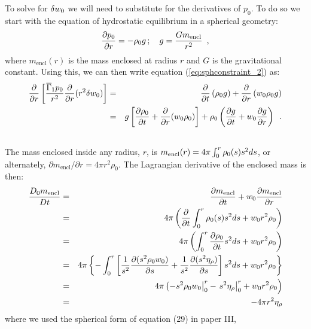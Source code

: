 \begin{enumerate}
\begin{description}
To solve for $\delta w_0$ we will need to substitute for the derivatives of $p_0.$
To do so we start with the equation of hydrostatic equilibrium in a spherical geometry:
\begin{equation}
\frac{\partial p_0}{\partial r} = -\rho_0 g \, ; \quad
g = \frac{G m_\mathrm{encl}}{r^2}\enskip,
\end{equation}
where $m_\mathrm{encl}(r)$ is the mass enclosed at radius $r$ and $G$ is the
gravitational constant.  
Using this, we can then write equation (\ref{eq:sphconstraint_2}) as:
\begin{eqnarray}
\frac{\partial}{\partial r} \left[ \frac{\overline{\Gamma}_1 p_0}{r^2} \frac{\partial}{\partial r} (r^2 \delta w_0) \right] &=&
 \frac{\partial}{\partial t} \left (\rho_0 g \right )
+\frac{\partial}{\partial r} \left (w_0 \rho_0 g \right) \nonumber \\
&=&
  g \left[ \frac{\partial \rho_0}{\partial t} + \frac{\partial}{\partial r} (w_0 \rho_0) \right]
+ \rho_0 \left( \frac{\partial g}{\partial t} + w_0 \frac{\partial g}{\partial r} \right) \enskip.\nonumber\\
&&
\label{eq:sphconstraint_3}
\end{eqnarray}
The mass enclosed inside any radius, $r$, is $m_\mathrm{encl}(r) = 4 \pi
\int_0^r \rho_0(s) s^2 ds$, or alternately, $\partial m_\mathrm{encl}/\partial r = 4\pi r^2 \rho_0$.  
The Lagrangian derivative of the enclosed mass is then:
\begin{eqnarray}
\frac{D_0 m_\mathrm{encl}}{D t} &=& \frac{\partial m_\mathrm{encl}}{\partial t} + w_0 \frac{\partial m_\mathrm{encl}}{\partial r} \nonumber \\
 &=& 4\pi \left( \frac{\partial}{\partial t} \int_0^r \rho_0(s) s^2 ds + w_0 r^2 \rho_0 \right) \nonumber \\
&=& 4\pi \left( \int_0^r \frac{\partial \rho_0}{\partial t} s^2 ds + w_0 r^2 \rho_0 \right) \nonumber \\
&=& 4\pi \left\{ -\int_0^r \left [ \frac{1}{s^2}\frac{\partial(s^2 \rho_0 w_0)}{\partial s} + \frac{1}{s^2}\frac{\partial (s^2 \eta_{\rho})}{\partial s} \right ]s^2 ds + w_0 r^2 \rho_0 \right\} \nonumber \\
&=&  \left . 4\pi \left(-s^2 \rho_0 w_0 \right |_0^r - \left . s^2 \eta_{\rho} \right |_0^r + w_0 r^2 \rho_0 \right) \nonumber \\
&=& -4\pi r^2 \eta_{\rho} \label{eq:dmdt}
\end{eqnarray}
where we used the spherical form of equation (29) in paper III, 
\begin{equation}

\end{equation}
\end{description}
\end{enumerate}
